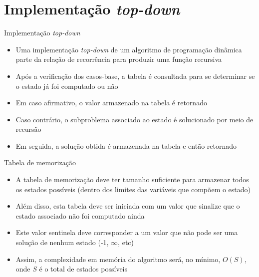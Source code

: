 \section{Implementação {\it top-down}}

\begin{frame}[fragile]{Implementação {\it top-down}}

    \begin{itemize}
        \item Uma implementação \textit{top-down} de um algoritmo de programação dinâmica parte
            da relação de recorrência para produzir uma função recursiva
        \pause

        \item Após a verificação dos casos-base, a tabela é consultada para se determinar se o 
            estado já foi computado ou não
        \pause

        \item Em caso afirmativo, o valor armazenado na tabela é retornado
        \pause

        \item Caso contrário, o subproblema associado ao estado é solucionado por meio de recursão
        \pause

        \item Em seguida, a solução obtida é armazenada na tabela e então retornado
    \end{itemize}

\end{frame}

\begin{frame}[fragile]{Tabela de memorização}

    \begin{itemize}
        \item A tabela de memorização deve ter tamanho suficiente para armazenar todos os estados
            possíveis (dentro dos limites das variáveis que compõem o estado)
        \pause

        \item Além disso, esta tabela deve ser iniciada com um valor que sinalize que o estado
            associado não foi computado ainda
        \pause

        \item Este valor sentinela deve corresponder a um valor que não pode ser uma solução de
            nenhum estado (-1, $\infty$, etc)
        \pause

        \item Assim, a complexidade em memória do algoritmo será, no mínimo, $O(S)$, onde $S$
            é o total de estados possíveis
    \end{itemize}

\end{frame}

